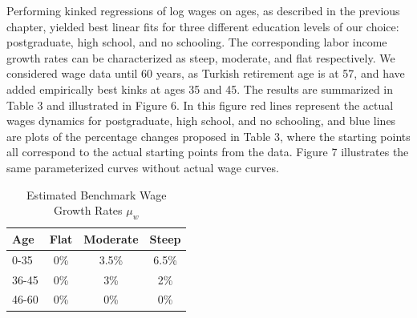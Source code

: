 \documentclass[]{article}
\begin{document}
Performing kinked regressions of log wages on ages, as described in the previous chapter, yielded best linear fits for three different education levels of our choice: postgraduate, high school, and no schooling. The corresponding labor income growth rates can be characterized as steep, moderate, and flat respectively. We considered wage data until 60 years, as Turkish retirement age is at 57, and have added empirically best kinks at ages 35 and 45. The results are summarized in Table 3 and illustrated in Figure 6. In this figure red lines represent the actual wages dynamics for postgraduate, high school, and no schooling, and blue lines are plots of the percentage changes proposed in Table 3, where the starting points all correspond to the actual starting points from the data. Figure 7 illustrates the same parameterized curves without actual wage curves. 

\begin{table}
	\centering
	\caption{Estimated Benchmark Wage Growth Rates $\mu_w$}
	\begin{tabular}[c]{l|ccc}
		Age&Flat&Moderate&Steep\\
		\hline
		0-35&0\%&3.5\%&6.5\%\\
		36-45&0\%&3\%&2\%\\
		46-60&0\%&0\%&0\%\\
	\end{tabular}
\end{table}
\end{document}
